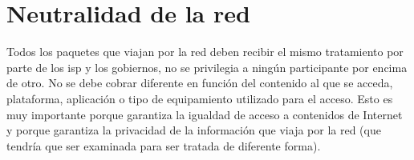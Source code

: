 \section{Neutralidad de la red}

Todos los paquetes que viajan por la red deben recibir el mismo tratamiento por parte de los \gls{isp} y los gobiernos, no se privilegia a ningún participante por encima de otro.
No se debe cobrar diferente en función del contenido al que se acceda, plataforma, aplicación o tipo de equipamiento utilizado para el acceso.
Esto es muy importante porque garantiza la igualdad de acceso a contenidos de Internet y porque garantiza la privacidad de la información que viaja por la red (que tendría que ser examinada para ser tratada de diferente forma).
